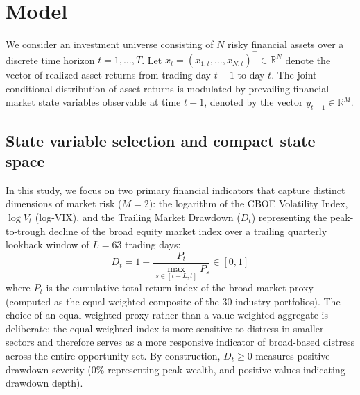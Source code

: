 \documentclass[smallcondensed]{svjour3}
\begin{document}
\section{Model}\label{sec:model}
We consider an investment universe consisting of $N$ risky financial assets over a discrete time horizon $t = 1, \dots, T$. Let $x_t = (x_{1,t}, \dots, x_{N,t})^\top \in \mathbb{R}^N$ denote the vector of realized asset returns from trading day $t-1$ to day $t$. The joint conditional distribution of asset returns is modulated by prevailing financial-market state variables observable at time $t-1$, denoted by the vector $y_{t-1} \in \mathbb{R}^M$.

\subsection{State variable selection and compact state space}
In this study, we focus on two primary financial indicators that capture distinct dimensions of market risk ($M = 2$): the logarithm of the CBOE Volatility Index, $\log V_t$ (log-VIX), and the Trailing Market Drawdown ($D_t$) representing the peak-to-trough decline of the broad equity market index over a trailing quarterly lookback window of $L = 63$ trading days:
\begin{equation}
    D_t = 1 - \frac{P_t}{\max_{s \in [t-L, t]} P_s} \in [0, 1]
\end{equation}
where $P_t$ is the cumulative total return index of the broad market proxy (computed as the equal-weighted composite of the 30 industry portfolios). The choice of an equal-weighted proxy rather than a value-weighted aggregate is deliberate: the equal-weighted index is more sensitive to distress in smaller sectors and therefore serves as a more responsive indicator of broad-based distress across the entire opportunity set. By construction, $D_t \ge 0$ measures positive drawdown severity ($0\%$ representing peak wealth, and positive values indicating drawdown depth).
\end{document}
